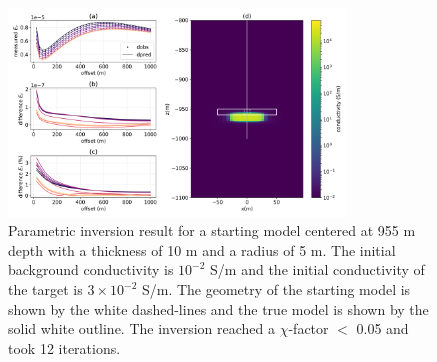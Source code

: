 \begin{figure}
    \begin{center}
    \includegraphics[width=0.8\textwidth]{figures/inversion/parametric_voxel2_dz10.png}
    \end{center}
\caption{
    Parametric inversion result for a starting model
    centered at 955 m depth with a thickness of 10 m and a radius of 5 m. The initial background
    conductivity is $10^{-2}$ S/m and the initial conductivity of the target is $3\times10^{-2}$ S/m.
    The geometry of the starting model is shown by the white dashed-lines and the
    true model is shown by the solid white outline. The inversion reached a $\chi$-factor $<$ 0.05
    and took 12 iterations.
}
\label{fig:parametric_voxel2_dz10}
\end{figure}
